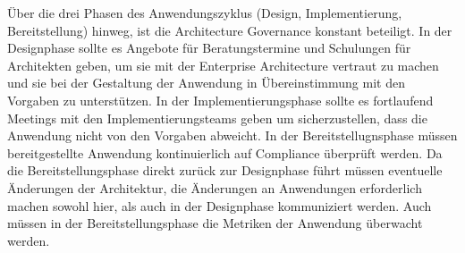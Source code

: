 Über die drei Phasen des Anwendungszyklus (Design, Implementierung, Bereitstellung) hinweg, ist die Architecture Governance konstant beteiligt. In der Designphase sollte es Angebote für Beratungstermine und Schulungen für Architekten geben, um sie mit der Enterprise Architecture vertraut zu machen und sie bei der Gestaltung der Anwendung in Übereinstimmung mit den Vorgaben zu unterstützen. In der Implementierungsphase sollte es fortlaufend Meetings mit den Implementierungsteams geben um sicherzustellen, dass die Anwendung nicht von den Vorgaben abweicht. In der Bereitstellugnsphase müssen bereitgestellte Anwendung kontinuierlich auf Compliance überprüft werden. Da die Bereitstellungsphase direkt zurück zur Designphase führt müssen eventuelle Änderungen der Architektur, die Änderungen an Anwendungen erforderlich machen sowohl hier, als auch in der Designphase kommuniziert werden. Auch müssen in der Bereitstellungsphase die Metriken der Anwendung überwacht werden.
